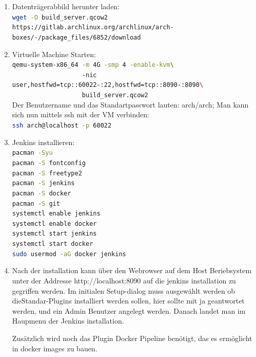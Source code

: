\begin{enumerate}
    \item Datenträgerabbild herunter laden:\\
        \lstinline[language=sh]!wget -O build_server.qcow2 https://gitlab.archlinux.org/archlinux/arch-boxes/-/package_files/6852/download!
    \item Virtuelle Machine Starten:\\
    \lstinline[language=sh]!qemu-system-x86_64 -m 4G -smp 4 -enable-kvm\! \\
    \lstinline[language=sh]!                   -nic user,hostfwd=tcp::60022-:22,hostfwd=tcp::8090-:8090\ !\\
    \lstinline[language=sh]!                   build_server.qcow2!\\
    Der Benutzername und das Standartpasswort lauten: arch/arch; Man kann sich nun mittels ssh mit der \ac{VM} verbinden:\\
    \lstinline[language=sh]!ssh arch@localhost -p 60022!\\
    \item Jenkins installieren:\\
    \lstinline[language=sh]!pacman -Syu !\\
    \lstinline[language=sh]!pacman -S fontconfig!\\
    \lstinline[language=sh]!pacman -S freetype2!\\
    \lstinline[language=sh]!pacman -S jenkins!\\
    \lstinline[language=sh]!pacman -S docker!\\
    \lstinline[language=sh]!pacman -S git!\\
    \lstinline[language=sh]!systemctl enable jenkins!\\
    \lstinline[language=sh]!systemctl enable docker!\\
    \lstinline[language=sh]!systemctl start jenkins!\\
    \lstinline[language=sh]!systemctl start docker!\\
    \lstinline[language=sh]!sudo usermod -aG docker jenkins!\\
    \item Nach der installation kann über den Webrowser auf dem Host Beriebsystem unter der Addresse http://localhost:8090 auf die jenkins installation zu gegriffen werden. Im initialen Setup-dialog muss ausgewählt werden ob dieStandar-Plugins installiert werden sollen, hier sollte mit ja geantwortet werden, und ein Admin Benutzer angelegt werden. Danach landet man im Haupmenu der Jenkins installation.

Zusätzlich wird noch das Plugin \glqq Docker Pipeline\grqq{} benötigt, das es ermöglicht in docker images zu bauen.
\end{enumerate}

